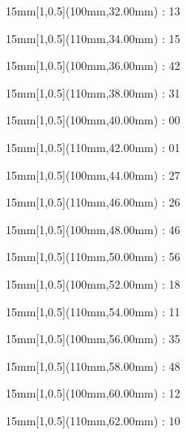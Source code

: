 \documentclass[a5paper]{memoir}
\begin{document}
\begin{textblock*}{15mm}[1,0.5](100mm,32.00mm) : 13\gridstrut\end{textblock*}
\begin{textblock*}{15mm}[1,0.5](110mm,34.00mm) : 15\gridstrut\end{textblock*}
\begin{textblock*}{15mm}[1,0.5](100mm,36.00mm) : 42\gridstrut\end{textblock*}
\begin{textblock*}{15mm}[1,0.5](110mm,38.00mm) : 31\gridstrut\end{textblock*}
\begin{textblock*}{15mm}[1,0.5](100mm,40.00mm) : 00\gridstrut\end{textblock*}
\begin{textblock*}{15mm}[1,0.5](110mm,42.00mm) : 01\gridstrut\end{textblock*}
\begin{textblock*}{15mm}[1,0.5](100mm,44.00mm) : 27\gridstrut\end{textblock*}
\begin{textblock*}{15mm}[1,0.5](110mm,46.00mm) : 26\gridstrut\end{textblock*}
\begin{textblock*}{15mm}[1,0.5](100mm,48.00mm) : 46\gridstrut\end{textblock*}
\begin{textblock*}{15mm}[1,0.5](110mm,50.00mm) : 56\gridstrut\end{textblock*}
\begin{textblock*}{15mm}[1,0.5](100mm,52.00mm) : 18\gridstrut\end{textblock*}
\begin{textblock*}{15mm}[1,0.5](110mm,54.00mm) : 11\gridstrut\end{textblock*}
\begin{textblock*}{15mm}[1,0.5](100mm,56.00mm) : 35\gridstrut\end{textblock*}
\begin{textblock*}{15mm}[1,0.5](110mm,58.00mm) : 48\gridstrut\end{textblock*}
\begin{textblock*}{15mm}[1,0.5](100mm,60.00mm) : 12\gridstrut\end{textblock*}
\begin{textblock*}{15mm}[1,0.5](110mm,62.00mm) : 10\gridstrut\end{textblock*}
\end{document}
